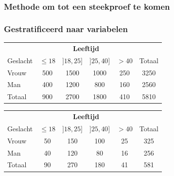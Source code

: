 \documentclass{beamer}
\begin{document}
\begin{frame}
  \frametitle{Methode om tot een steekproef te komen}
  \begin{center}
  \end{center}

\end{frame}

\begin{frame}
  \frametitle{Gestratificeerd naar variabelen}

  \begin{center}
    \begin{tabular}{l|cccc|c}
      & \multicolumn{4}{c|}{\textbf{Leeftijd}} & \\
      Geslacht & $\le 18$ & $]18,25]$ & $]25, 40]$ & $> 40$ & Totaal\\
      \hline
      Vrouw & 500 & 1500 & 1000 & 250 & 3250 \\
      Man   & 400 & 1200 & 800 & 160 & 2560\\
      \hline
      Totaal & 900 & 2700 & 1800 & 410 & 5810
    \end{tabular}

    \vspace{1cm}

    \pause
    \begin{tabular}{l|cccc|c}
      & \multicolumn{4}{c|}{\textbf{Leeftijd}} & \\
      Geslacht & $\le 18$ & $]18,25]$ & $]25, 40]$ & $> 40$ & Totaal\\
      \hline
      Vrouw & 50 & 150 & 100 & 25 & 325 \\
      Man   & 40 & 120 & 80 & 16 & 256\\
      \hline
      Totaal & 90 & 270 & 180 & 41 & 581
    \end{tabular}

  \end{center}
\end{frame}
\end{document}
